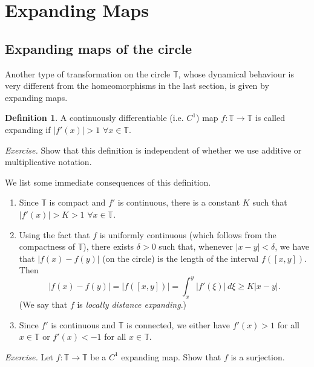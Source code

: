 \documentclass[12pt]{article}
\theoremstyle{definition}
\newtheorem{definition}[theorem]{Definition}
\theoremstyle{remark}
\begin{document}
\newpage 
\section{Expanding Maps}

\subsection{Expanding maps of the circle}
Another type of transformation on the circle $\mathbb T$, whose dynamical behaviour is very different from 
the homeomorphisms in the last section, is
given by expanding maps.

\begin{definition}
A continuously differentiable (i.e. $C^1$) map $f : \mathbb T \to \mathbb T$ is called expanding if $|f'(x)| > 1$
$\forall x \in  \mathbb T$.
\end{definition}

\noindent
{\it Exercise.} Show that this definition is independent of whether we use additive
or multiplicative notation. 

\medskip

We list some immediate consequences of this definition.
\begin{enumerate}
\item
Since $\mathbb T$ is compact and $f'$ is continuous, there is a constant $K$ such that $|f'(x)| > K > 1$
$\forall x \in \mathbb T$. 
\item
Using the fact that $f$ is uniformly continuous (which follows from the compactness of $\mathbb T$),
there exists $\delta>0$ such that, whenever $|x-y|<\delta$, we have that $|f(x)-f(y)|$ (on the circle) is the length
of the interval $f([x,y])$. Then
\[
|f(x)-f(y)| = |f([x,y])| = \int_x^y |f'(\xi)| \, d\xi \ge K|x-y|.
\]
(We say that $f$ is {\it locally distance expanding}.)
\item
Since $f'$ is continuous and $\mathbb T$ is connected, we either have $f'(x)>1$ for all $x \in \mathbb T$ or $f'(x)<-1$ for all 
$x \in \mathbb T$.
\end{enumerate}

\noindent
{\it Exercise.} Let $f : \mathbb T \to \mathbb T$ be a $C^1$ expanding map. Show that $f$ is a surjection.
\end{document}
